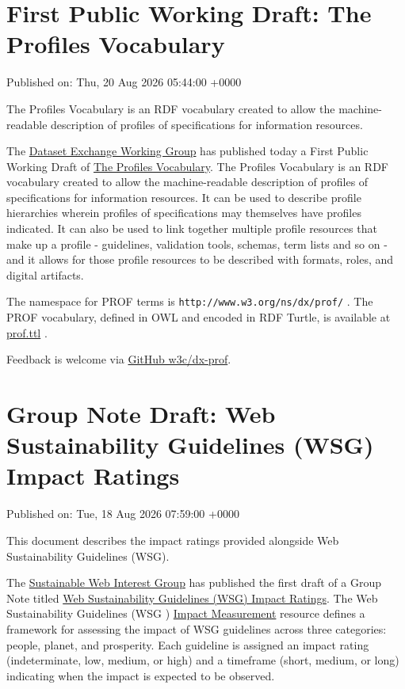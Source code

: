 \documentclass[11pt,a4paper]{article}
\begin{document}
\section{First Public Working Draft: The Profiles Vocabulary}

Published on: Thu, 20 Aug 2026 05:44:00 +0000

The Profiles Vocabulary is an RDF vocabulary created to allow the machine-readable description of profiles of specifications for information resources.

The \href{https://www.w3.org/groups/wg/dx}{Dataset Exchange Working Group} has published today a First Public Working Draft of \href{https://www.w3.org/TR/2026/WD-dx-prof-1.0-20260820/}{The Profiles Vocabulary}. The Profiles Vocabulary is an RDF vocabulary created to allow the machine-readable description of profiles of specifications for information resources. It can be used to describe profile hierarchies wherein profiles of specifications may themselves have profiles indicated. It can also be used to link together multiple profile resources that make up a profile - guidelines, validation tools, schemas, term lists and so on - and it allows for those profile resources to be described with formats, roles, and digital artifacts.

The namespace for PROF terms is \texttt{http://www.w3.org/ns/dx/prof/} .
The PROF vocabulary, defined in OWL and encoded in RDF Turtle, is available at \href{https://www.w3.org/TR/2026/WD-dx-prof-1.0-20260820/rdf/prof.ttl}{prof.ttl} .

Feedback is welcome via \href{https://github.com/w3c/dx-prof/}{GitHub w3c/dx-prof}.

\section{Group Note Draft: Web Sustainability Guidelines (WSG) Impact Ratings}

Published on: Tue, 18 Aug 2026 07:59:00 +0000

This document describes the impact ratings provided alongside Web Sustainability Guidelines (WSG).

The \href{https://www.w3.org/groups/ig/sustainableweb}{Sustainable Web Interest Group} has published the first draft of a Group Note titled \href{https://www.w3.org/TR/2026/DNOTE-wsg-ir-20260818/}{Web Sustainability Guidelines (WSG) Impact Ratings}. The Web Sustainability Guidelines (WSG ) \href{https://w3c.github.io/sustainableweb-impact}{Impact Measurement} resource defines a framework for assessing the impact of WSG guidelines across three categories: people, planet, and prosperity. Each guideline is assigned an impact rating (indeterminate, low, medium, or high) and a timeframe (short, medium, or long) indicating when the impact is expected to be observed.
\end{document}
